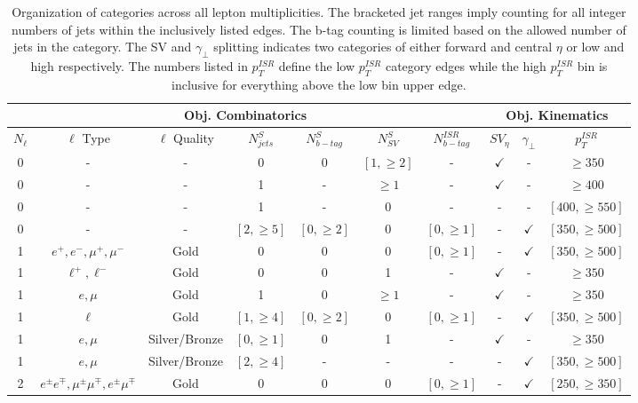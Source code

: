 \begin{table}
\caption{Organization of categories across all lepton multiplicities. The bracketed jet ranges imply counting for all integer numbers of jets within the inclusively listed edges. The b-tag counting is limited based on the allowed number of jets in the category. The SV and $\gamma_\perp$ splitting indicates two categories of either forward and central $\eta$ or low and high respectively. The numbers listed in $p_T^{ISR}$ define the low $p_T^{ISR}$ category edges while the high $p_T^{ISR}$ bin is inclusive for everything above the low bin upper edge.}
\begin{adjustwidth}{-0.7in}{-1in}

\begin{tabular}{|c|c|c|c|c|c|c|c|c|c|}
\multicolumn{7}{c|}{Obj. Combinatorics} & \multicolumn{3}{c}{Obj. Kinematics} \\
\hline 
$N_\ell$ &  $\ell$ Type & $\ell$ Quality & $N_{jets}^{S}$ & $N_{b-tag}^{S}$ & $N_{SV}^S$ & $N_{b-tag}^{ISR}$ & $SV_\eta$ & $\gamma_\perp$ & $p_T^{ISR}$ \\ 
\hline
\hline 
0 & - & - & 0 & 0 & $[1,\geq 2]$ & - & $\checkmark$ & - & $\geq 350$ \\ 
0 & - & - & 1 & - & $\geq 1$ &    - & $\checkmark$ & - & $\geq 400$ \\
0 & - & - & 1 & - &  0       &    - &  -           & - & $[400,\geq 550]$ \\
0 & - & - & $[2,\geq 5]$ & $[0,\geq 2]$ & 0 & $[0,\geq 1]$ & - & $\checkmark$ & $[350,\geq500]$ \\
\hline 
1 & $e^+,e^-,\mu^+,\mu^-$& Gold & 0 & 0 & 0 & $[0,\geq 1]$ & - & $\checkmark$ & $[350, \geq 500]$ \\
1 & $\ell^+, \ell^-$  & Gold & 0 & 0 & 1 & - & $\checkmark$ & - & $\geq 350$ \\
1 & $e, \mu$ & Gold & 1 & 0 &  $\geq 1$ & - & $\checkmark$ & - & $\geq 350$ \\
1 & $\ell$ & Gold & $[1,\geq 4]$ & $[0,\geq 2]$ & 0 & $[0,\geq 1]$ & - & $\checkmark$ & $[350, \geq 500]$ \\
1 & $e, \mu$ & Silver/Bronze & $[0,\geq 1]$ & 0 & 1 & - & $\checkmark$ & - & $\geq 350$ \\
1 & $e, \mu$ & Silver/Bronze & $[2, \geq 4]$ & - & - & - & - & $\checkmark$ & $[350, \geq 500]$ \\
\hline
2 & $e^\pm e^\mp, \mu^\pm \mu^\mp, e^\pm \mu^\mp $ & Gold & 0 & 0 & 0 & $[0,\geq 1]$ & - & $\checkmark$ & $[250,\geq350]$  \\

\end{tabular}
\end{adjustwidth}
\end{table}
